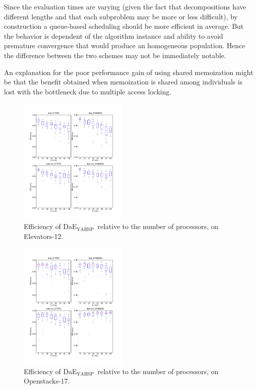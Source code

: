\documentclass{sig-alternate}
\newcommand{\DAEYAHSP}{{\sc DaE$_{\text{YAHSP}}$}}
\newcommand{\OPENSTACKS}{{\sc Openstacks}}
\newcommand{\ELEVATORS}{{\sc Elevators}}
\begin{document}
Since the evaluation times are varying (given the fact that decompositions have
different lengths and that each subproblem may be more or less difficult), by
construction a queue-based scheduling should be more efficient in
average. But the behavior is dependent of the algorithm instance
and ability to avoid premature convergence that would
produce an homogeneous population. Hence the difference between the two
schemes may not be immediately notable.

An explanation for the poor performance gain of using shared memoization might
be that the benefit obtained when memoization is shared among individuals is
lost with the bottleneck due to multiple access locking.

\begin{figure}[H]
\begin{center}
\includegraphics[width=0.47\textwidth]{images/EXP2_Efficiency_IPC6_SEQ_ELEVATORS_12_S96.pdf}
\caption{Efficiency of \DAEYAHSP\ relative to the number of processors, on \ELEVATORS-12.}
\label{fig:exp2_efficiency_core_elevators_12_pop_96}
\end{center}
\end{figure}

\begin{figure}[H]
\begin{center}
\includegraphics[width=0.47\textwidth]{images/EXP2_Efficiency_IPC6_TEMPO_OPENSTACKS_17_S96.pdf}
\caption{Efficiency of \DAEYAHSP\ relative to the number of processors, on \OPENSTACKS-17.}
\label{fig:exp2_efficiency_core_openstacks_17_pop_96}
\end{center}
\end{figure}
\end{document}
